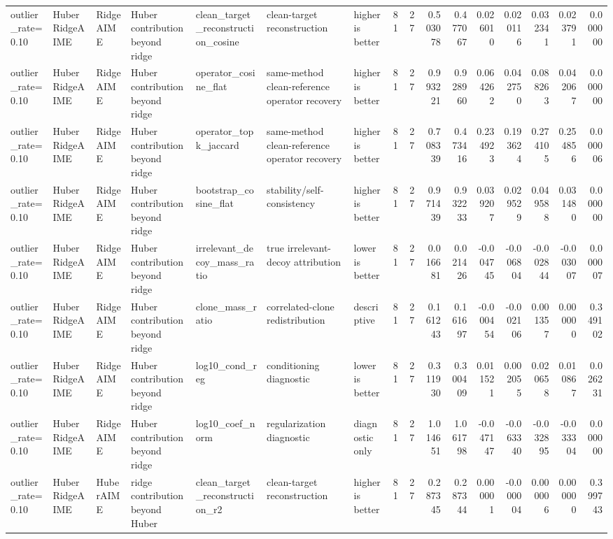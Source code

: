 \begin{table}[t]
\begin{tabular}{lllllllrrrrrrrrr}
outlier_rate=0.10 & HuberRidgeAIME & RidgeAIME & Huber contribution beyond ridge & clean_target_reconstruction_cosine & clean-target reconstruction & higher is better & 81 & 27 & 0.503078 & 0.477067 & 0.026010 & 0.020116 & 0.032341 & 0.023791 & 0.000000 \\
outlier_rate=0.10 & HuberRidgeAIME & RidgeAIME & Huber contribution beyond ridge & operator_cosine_flat & same-method clean-reference operator recovery & higher is better & 81 & 27 & 0.993221 & 0.928960 & 0.064262 & 0.042750 & 0.088263 & 0.042067 & 0.000000 \\
outlier_rate=0.10 & HuberRidgeAIME & RidgeAIME & Huber contribution beyond ridge & operator_topk_jaccard & same-method clean-reference operator recovery & higher is better & 81 & 27 & 0.708339 & 0.473416 & 0.234923 & 0.193624 & 0.274105 & 0.254856 & 0.000006 \\
outlier_rate=0.10 & HuberRidgeAIME & RidgeAIME & Huber contribution beyond ridge & bootstrap_cosine_flat & stability/self-consistency & higher is better & 81 & 27 & 0.971439 & 0.932233 & 0.039207 & 0.029529 & 0.049588 & 0.031480 & 0.000000 \\
outlier_rate=0.10 & HuberRidgeAIME & RidgeAIME & Huber contribution beyond ridge & irrelevant_decoy_mass_ratio & true irrelevant-decoy attribution & lower is better & 81 & 27 & 0.016681 & 0.021426 & -0.004745 & -0.006804 & -0.002844 & -0.003007 & 0.000007 \\
outlier_rate=0.10 & HuberRidgeAIME & RidgeAIME & Huber contribution beyond ridge & clone_mass_ratio & correlated-clone redistribution & descriptive & 81 & 27 & 0.161243 & 0.161697 & -0.000454 & -0.002106 & 0.001357 & 0.000000 & 0.349102 \\
outlier_rate=0.10 & HuberRidgeAIME & RidgeAIME & Huber contribution beyond ridge & log10_cond_reg & conditioning diagnostic & lower is better & 81 & 27 & 0.311930 & 0.300409 & 0.011521 & 0.002055 & 0.020658 & 0.010867 & 0.026231 \\
outlier_rate=0.10 & HuberRidgeAIME & RidgeAIME & Huber contribution beyond ridge & log10_coef_norm & regularization diagnostic & diagnostic only & 81 & 27 & 1.014651 & 1.061798 & -0.047147 & -0.063340 & -0.032895 & -0.033304 & 0.000000 \\
outlier_rate=0.10 & HuberRidgeAIME & HuberAIME & ridge contribution beyond Huber & clean_target_reconstruction_r2 & clean-target reconstruction & higher is better & 81 & 27 & 0.287345 & 0.287344 & 0.000001 & -0.000004 & 0.000006 & 0.000000 & 0.399743 \\

\end{tabular}
\end{table}
